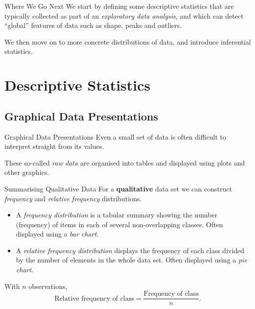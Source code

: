 \documentclass[10pt,aspectratio=169]{beamer}
\begin{document}
\begin{frame}{Where We Go Next}
  We start by defining some descriptive statistics that are typically collected
  as part of an \emph{exploratory data analysis}, and which can detect
  ``global'' features of data such as shape, peaks and outliers.

  \vspace{1em}
  We then move on to more concrete distributions of data, and introduce
  inferential statistics.
\end{frame}

\section{Descriptive Statistics}

\subsection{Graphical Data Presentations}

\begin{frame}{Graphical Data Presentations}
  Even a small set of data is often difficult to interpret straight from its
  values.

  \vspace{1em}
  These so-called \emph{raw data} are organised into tables and displayed using
  plots and other graphics.
\end{frame}

\begin{frame}{Summarising Qualitative Data}
  For a \textbf{qualitative} data set we can construct \emph{frequency} and
  \emph{relative frequency} distributions.

  \begin{itemize}
    \item A \emph{frequency distribution} is a tabular summary showing the
          number (frequency) of items in each of several non-overlapping
          classes. Often displayed using a \emph{bar chart}.
    \item A \emph{relative frequency distribution} displays the frequency of
          each class divided by the number of elements in the whole data set.
          Often displayed using a \emph{pie chart}.
  \end{itemize}

  With $n$ observations,
  \[
    \text{Relative frequency of class} = \frac{\text{Frequency of class}}{n}.
  \]
\end{frame}
\end{document}
